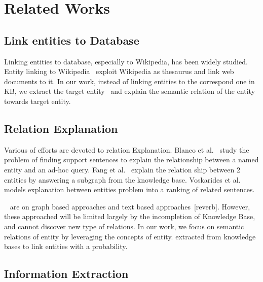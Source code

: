 \section{Related Works}




\subsection{Link entities to Database}

Linking entities to database, especially to Wikipedia, has been widely studied. Entity linking to Wikipedia~\cite{milne2008learning,mihalcea2007wikify,han2011collective} exploit Wikipedia as thesaurus and link web documents to it.
In our work, instead of linking entities to the correspond one in KB, we extract the target entity~\cite{dalvi2011automatic} and explain the semantic relation of the entity towards target entity.


\subsection{Relation Explanation}


Various of efforts are devoted to relation Explanation.
Blanco et al.~\cite{blanco2010finding} study the problem of finding support sentences to explain the relationship between a named entity and an ad-hoc query.  Fang et al.~\cite{fang2011rex} explain the relation ship between 2 entities by answering a subgraph from the knowledge base. Voskarides et al.~\cite{voskarideslearning} models explanation between entities problem into a ranking of related sentences.

~\cite{shahaf2010connecting,luo2007answering} are on graph based approaches and text based approaches~\cite{hasegawa2004discovering}[reverb].
However, these approached will be limited largely by the incompletion of Knowledge Base, and cannot discover new type of relations.
In our work, we focus on semantic relations of entity by leveraging the concepts of entity. extracted from knowledge bases to link entities with a probability.


\subsection{Information Extraction}

